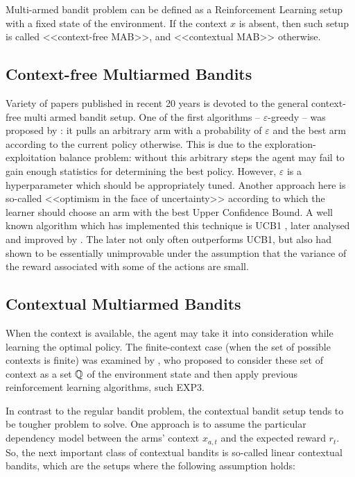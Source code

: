   Multi-armed bandit problem can be defined as a Reinforcement Learning setup with a fixed state of the environment. If the context $x$ is absent, then such setup is called <<context-free MAB>>, and <<contextual MAB>> otherwise. 
  
  \subsection{Context-free Multiarmed Bandits}
  Variety of papers published in recent 20 years is devoted to the general context-free multi armed bandit setup. One of the first algorithms -- $\varepsilon$-greedy -- was proposed by \cite{Auer2002}: it pulls an arbitrary arm with a probability of $\varepsilon$ and the best arm according to the current policy otherwise. This is due to the exploration-exploitation balance problem: without this arbitrary steps the agent may fail to gain enough statistics for determining the best policy. However, $\varepsilon$ is a hyperparameter which should be appropriately tuned. Another approach here is so-called <<optimism in the face of uncertainty>> \cite{Lai1985} according to which the learner should choose an arm with the best Upper Confidence Bound. A well known algorithm which has implemented this technique is UCB1 \cite{Auer2002}, later analysed and improved by \cite{Audibert2009}. The later not only often outperforms UCB1, but also had shown to be essentially unimprovable under the assumption that the variance of the reward associated with some of the actions are small.
  
  \subsection{Contextual Multiarmed Bandits}
  When the context is available, the agent may take it into consideration while learning the optimal policy. The finite-context case (when the set of possible contexts is finite) was examined by \cite{Auer2002b}, who proposed to consider these set of context as a set $\operatorname{\mathbb{Q}}$ of the environment state and then apply previous reinforcement learning algorithms, such EXP3. 
  
  In contrast to the regular bandit problem, the contextual bandit setup tends to be tougher problem to solve. One approach is to assume the particular dependency model between the arms' context $x_{a,t}$ and the expected reward $r_t$. So, the next important class of contextual bandits is so-called linear contextual bandits, which are the setups where the following assumption holds:
  
